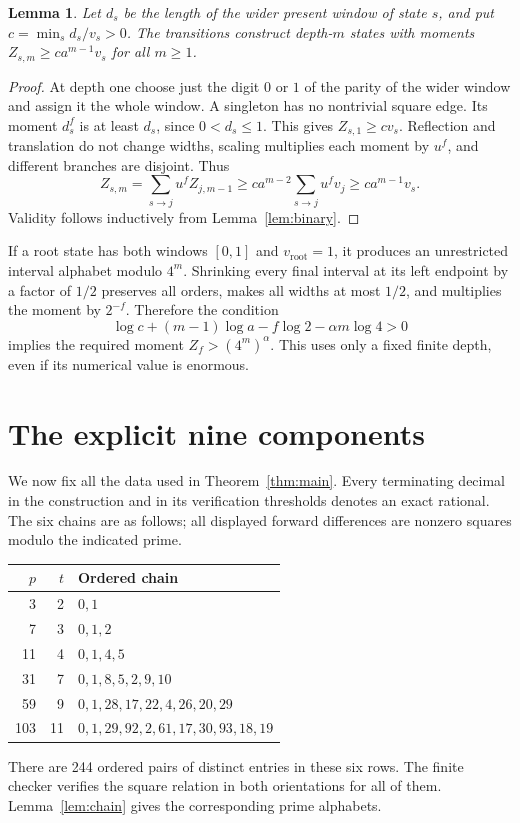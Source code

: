 \documentclass[11pt]{article}
\newtheorem{lemma}[theorem]{Lemma}
\theoremstyle{definition}
\theoremstyle{remark}
\begin{document}
\begin{lemma}\label{lem:growth}
Let $d_s$ be the length of the wider present window of state $s$, and put
$c=\min_s d_s/v_s>0$. The transitions construct depth-$m$ states with
moments $Z_{s,m}\ge ca^{m-1}v_s$ for all $m\ge1$.
\end{lemma}
\begin{proof}
At depth one choose just the digit $0$ or $1$ of the parity of the wider
window and assign it the whole window. A singleton has no nontrivial
square edge. Its moment $d_s^f$ is at least $d_s$, since $0<d_s\le1$.
This gives $Z_{s,1}\ge cv_s$. Reflection and translation do not change
widths, scaling multiplies each moment by $u^f$, and different branches
are disjoint. Thus
\[
 Z_{s,m}=\sum_{s\to j}u^fZ_{j,m-1}
 \ge ca^{m-2}\sum_{s\to j}u^fv_j\ge ca^{m-1}v_s.
\]
Validity follows inductively from Lemma~\ref{lem:binary}.
\end{proof}

If a root state has both windows $[0,1]$ and $v_{\mathrm{root}}=1$, it
produces an unrestricted interval alphabet modulo $4^m$.
Shrinking every final interval at its left endpoint by a factor of $1/2$
preserves all orders, makes all widths at most $1/2$, and multiplies the
moment by $2^{-f}$. Therefore the condition
\begin{equation}\label{eq:binarymargin}
 \log c+(m-1)\log a-f\log2-\alpha m\log4>0
\end{equation}
implies the required moment $Z_f>(4^m)^\alpha$. This uses only a fixed
finite depth, even if its numerical value is enormous.

\section{The explicit nine components}\label{sec:parameters}
We now fix all the data used in Theorem~\ref{thm:main}. Every terminating
decimal in the construction and in its verification thresholds denotes an
exact rational. The six chains are as follows; all displayed forward
differences are nonzero squares modulo the indicated prime.
\begin{center}
\begin{tabular}{rrl}\toprule
$p$&$t$&Ordered chain\\\midrule
3&2&$0,1$\\
7&3&$0,1,2$\\
11&4&$0,1,4,5$\\
31&7&$0,1,8,5,2,9,10$\\
59&9&$0,1,28,17,22,4,26,20,29$\\
103&11&$0,1,29,92,2,61,17,30,93,18,19$\\\bottomrule
\end{tabular}
\end{center}
There are 244 ordered pairs of distinct entries in these six rows. The
finite checker verifies the square relation in both orientations for all
of them. Lemma~\ref{lem:chain} gives the corresponding prime alphabets.
\end{document}
